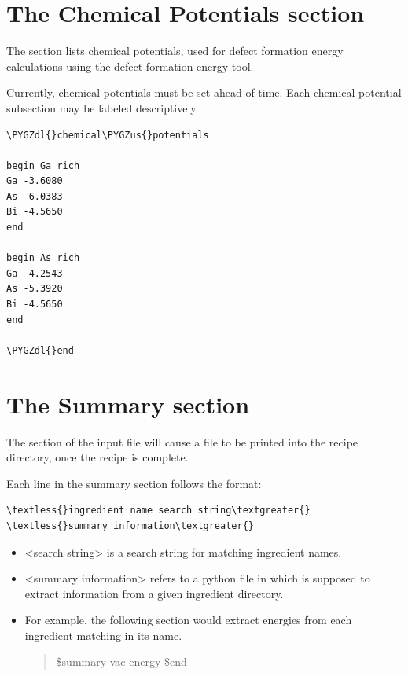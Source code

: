 \documentclass[letterpaper,10pt,english]{sphinxmanual}
\def\PYGZus{\char`\_}
\def\PYGZdl{\char`\$}
\begin{document}
\section{The Chemical Potentials section}
\label{3_1_7_chemicalpotentials:the-chemical-potentials-section}\label{3_1_7_chemicalpotentials::doc}
The  section lists chemical potentials, used for defect formation energy calculations using the defect formation energy tool.

Currently, chemical potentials must be set ahead of time. Each chemical potential subsection may be labeled descriptively.

\begin{Verbatim}[commandchars=\\\{\}]
\PYGZdl{}chemical\PYGZus{}potentials

begin Ga rich
Ga -3.6080
As -6.0383
Bi -4.5650
end

begin As rich
Ga -4.2543
As -5.3920
Bi -4.5650
end

\PYGZdl{}end
\end{Verbatim}


\section{The Summary section}
\label{3_1_8_summary:the-summary-section}\label{3_1_8_summary::doc}
The  section of the input file will cause a  file to be printed into the recipe directory, once the recipe is complete.

Each line in the summary section follows the format:

\begin{Verbatim}[commandchars=\\\{\}]
\textless{}ingredient name search string\textgreater{} \textless{}summary information\textgreater{}
\end{Verbatim}
\begin{itemize}
\item {} 
\textless{}search string\textgreater{} is a search string for matching ingredient names.

\item {} 
\textless{}summary information\textgreater{} refers to a python file in  which is supposed to extract information from a given ingredient directory.

\item {} 
For example, the following section would extract energies from each ingredient matching  in its name.
\begin{quote}

\$summary
vac energy
\$end
\end{quote}

\end{itemize}
\end{document}
